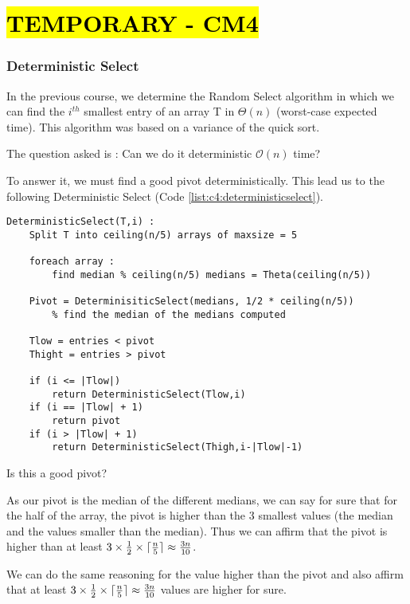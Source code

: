 \part*{\hl{TEMPORARY - CM4}}


\section{Deterministic Select}



In the previous course, we determine the Random Select algorithm in which we can find the $i^{th}$ smallest entry of an array T in $\Theta (n)$ (worst-case expected time). This algorithm was based on a variance of the quick sort.

The question asked is : Can we do it deterministic $\mathcal{O}(n)$ time?

To answer it, we must find a good pivot deterministically. This lead us to the following Deterministic Select (Code \ref{list:c4:deterministicselect}).

\begin{lstlisting}[label={list:c4:deterministicselect},caption=Pseudo-code of the Determinisic Select algorithm]
DeterministicSelect(T,i) :
    Split T into ceiling(n/5) arrays of maxsize = 5 
    
    foreach array : 
        find median % ceiling(n/5) medians = Theta(ceiling(n/5))
        
    Pivot = DeterminisiticSelect(medians, 1/2 * ceiling(n/5)) 
        % find the median of the medians computed
    
    Tlow = entries < pivot
    Thight = entries > pivot
    
    if (i <= |Tlow|)
        return DeterministicSelect(Tlow,i)
    if (i == |Tlow| + 1) 
        return pivot
    if (i > |Tlow| + 1)
        return DeterministicSelect(Thigh,i-|Tlow|-1)
\end{lstlisting}



Is this a good pivot?

As our pivot is the median of the different medians, we can say for sure that for the half of the array, the pivot is higher than the 3 smallest values (the median and the values smaller than the median). Thus we can affirm that the pivot is higher than at least $3\times \frac{1}{2} \times \lceil \frac{n}{5} \rceil \approx \frac{3n}{10}$.

We can do the same reasoning for the value higher than the pivot and also affirm that at least $3\times \frac{1}{2} \times \lceil \frac{n}{5} \rceil \approx \frac{3n}{10}$ values are higher for sure.

